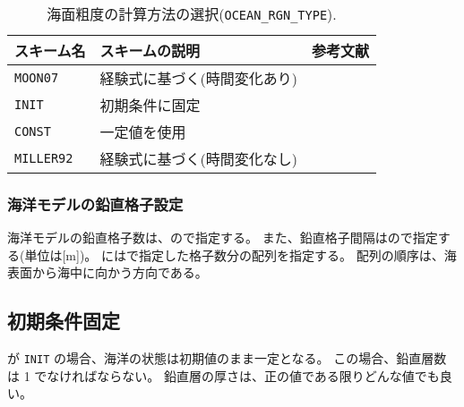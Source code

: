\begin{table}[h]
\begin{center}
  \caption{海面粗度の計算方法の選択(\texttt{OCEAN\_RGN\_TYPE}).}
  \label{tab:nml_ocean_rgn}
  \begin{tabularx}{150mm}{llX} \hline
    \rowcolor[gray]{0.9} スキーム名 & スキームの説明 & 参考文献 \\ \hline
      \verb|MOON07|   & 経験式に基づく(時間変化あり)   & \citet{moon_2007} \\
      \verb|INIT|     & 初期条件に固定 \\
      \verb|CONST|    & 一定値を使用 \\
      \verb|MILLER92| & 経験式に基づく(時間変化なし) & \citet{miller_1992} \\
    \hline
  \end{tabularx}
\end{center}
\end{table}


\subsubsection{海洋モデルの鉛直格子設定}

海洋モデルの鉛直格子数は、ので指定する。
また、鉛直格子間隔はので指定する(単位は[m])。
にはで指定した格子数分の配列を指定する。
配列の順序は、海表面から海中に向かう方向である。


\subsection{初期条件固定}
 が \verb|INIT| の場合、海洋の状態は初期値のまま一定となる。
この場合、鉛直層数は 1 でなければならない。
鉛直層の厚さは、正の値である限りどんな値でも良い。


